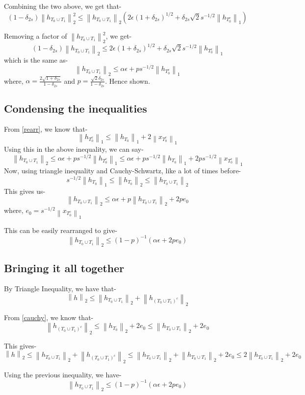 \documentclass[a4paper,11pt]{article}
\numberwithin{definition}{section}
\numberwithin{mytheorem}{subsection}
\newcommand\norm[1]{\left\lVert#1\right\rVert}
\begin{document}
Combining the two above, we get that-
$$(1 - \delta_{2s}) \norm{h_{T_0 \cup T_1}}_2^2 \leq \norm{ h_{T_0 \cup T_1}}_2 (2\epsilon (1 + \delta_{2s})^{1/2} + \delta_{2s}\sqrt{2}s^{-1/2} \norm{h_{T_0^c}}_1) $$

Removing a factor of $\norm{h_{T_0 \cup T_1}}_2^2$, we get-
$$(1 - \delta_{2s}) \norm{h_{T_0 \cup T_1}}_2 \leq 2\epsilon (1 + \delta_{2s})^{1/2} + \delta_{2s}\sqrt{2}s^{-1/2} \norm{h_{T_0^c}}_1 $$
which is the same as-
$$ \norm{h_{T_0 \cup T_1}}_2 \leq  \alpha\epsilon + p s^{-1/2} \norm{h_{T_0^c}}_1 $$
where, $\alpha = \frac{2 \sqrt{1 + \delta_{2s}}}{1 - \delta_{2s}}$ and $p = \frac{\sqrt{2}\delta_{2s}}{1 - \delta_{2s}}$. Hence shown.

\subsection{Condensing the inequalities}

From \ref{rearr}, we know that-
$$ \norm{h_{T_0^c}}_1 \leq  \norm{h_{T_0}}_1 + 2\norm{x_{T_0^c}}_1$$
Using this in the above inequality, we can say-
$$ \norm{h_{T_0 \cup T_1}}_2 \leq  \alpha\epsilon + p s^{-1/2} \norm{h_{T_0^c}}_1 \leq \alpha\epsilon + p s^{-1/2}\norm{h_{T_0}}_1 + 2p s^{-1/2}\norm{x_{T_0^c}}_1$$
Now, using triangle inequality and Cauchy-Schwartz, like a lot of times before-
$$ s^{-1/2} \norm{h_{T_0}}_1 \leq \norm{h_{T_0}}_2 \leq \norm{h_{T_0 \cup T_1}}_2$$
This gives us-
$$ \norm{h_{T_0 \cup T_1}}_2 \leq \alpha\epsilon + p \norm{h_{T_0 \cup T_1}}_2 + 2p e_0$$
where, $e_0 = s^{-1/2}\norm{x_{T_0^c}}_1$

This can be easily rearranged to give-
$$ \norm{h_{T_0 \cup T_1}}_2 \leq (1-p)^{-1}(\alpha\epsilon + 2p e_0)$$

\subsection{Bringing it all together}

By Triangle Inequality, we have that-
$$\norm{h}_2 \leq \norm{h_{T_0 \cup T_1}}_2 + \norm{h_{(T_0 \cup T_1)^c}}_2$$

From \ref{cauchy}, we know that-
$$\norm{h_{(T_0 \cup T_1)^c}}_2 \leq \norm{h_{T_0}}_2 + 2e_0 \leq \norm{h_{T_0\cup T_1}}_2 + 2e_0$$

This gives-
$$\norm{h}_2 \leq \norm{h_{T_0 \cup T_1}}_2 + \norm{h_{(T_0 \cup T_1)^c}}_2 \leq \norm{h_{T_0\cup T_1}}_2 + \norm{h_{T_0\cup T_1}}_2 + 2e_0 \leq 2\norm{h_{T_0\cup T_1}}_2 + 2e_0$$

Using the previous inequality, we have-
$$ \norm{h_{T_0 \cup T_1}}_2 \leq (1-p)^{-1}(\alpha\epsilon + 2p e_0)$$
\end{document}

